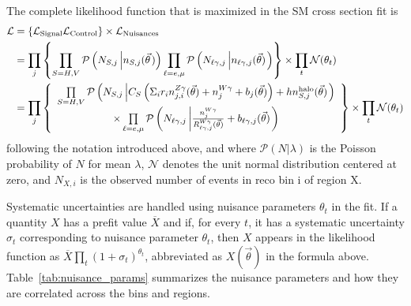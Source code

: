 The complete likelihood function that is maximized in the SM cross section fit is
\begin{align}
\begin{split}
  \mathcal{L} & = \left\{ \mathcal{L_{\text{Signal}}} \mathcal{L_{\text{Control}}} \right\} \times \mathcal{L_{\text{Nuisances}}} \\
  & = \prod_{j} \left\{
    \prod_{S=H,V} \mathcal{P}\left( N_{S, j} \left| \nS[,j] (\vec{\theta} \right.) \right) \prod_{\ell=\Pe,\Pmu} \mathcal{P}\left( N_{\ell\Pgamma, j} \left| \nl[,j] (\vec{\theta}) \right. \right) 
    \right\}  \times \prod_{t} \mathcal{N}(\theta_t) \\
  & = \prod_{j} \left\{
  \begin{array}{cc}
    \prod\limits_{S=H,V} \mathcal{P}\left( N_{S, j} \left| C_{S} \left(\Sigma_{i}r_{i}\nZg[j,i](\vec{\theta}) + \nWg[j] + b_{j}(\vec{\theta})\right) + h \nhalo[,j](\vec{\theta}) \right. \right) \\[1.3pt]
    \times \prod\limits_{\ell=\Pe,\Pmu} \mathcal{P}\left( N_{\ell\Pgamma, j} \left| \frac{\nWg[j]}{\RWl[,j](\vec{\theta})} + b_{\ell\Pgamma, j}(\vec{\theta}) \right. \right) \\[1.3pt]
  \end{array} \right\}
  \times \prod_{t} \mathcal{N}(\theta_t)
\end{split}
\end{align}
following the notation introduced above, and where $\mathcal{P}(N\vert\lambda)$ is the Poisson probability of $N$ for mean $\lambda$,
$\mathcal{N}$ denotes the unit normal distribution centered at zero, and $N_{X,i}$ is the observed number of events in reco bin i of region X.

Systematic uncertainties are handled using nuisance parameters $\theta_{t}$ in the fit.
If a quantity $X$ has a prefit value $\overline{X}$ and if, for every $t$, it has a systematic uncertainty $\sigma_{t}$ corresponding to nuisance
parameter $\theta_{t}$, then $X$ appears in the likelihood function as $\overline{X}\prod_{t}(1+\sigma_{t})^{\theta_{t}}$, abbreviated as $X(\vec{\theta})$
in the formula above. Table~\ref{tab:nuisance_params} summarizes the nuisance parameters and how they are correlated across the bins and regions.


